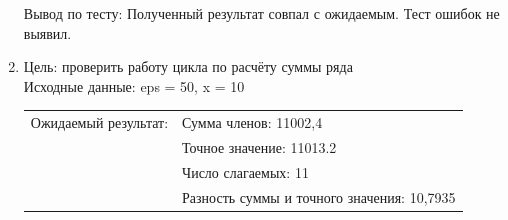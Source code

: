 \documentclass[a4paper]{article}
\begin{document}
\begin{enumerate}[label=\textbf{Тест \arabic*},start=3]
		Вывод по тесту: Полученный результат совпал с ожидаемым. Тест ошибок не выявил.
		\newpage
		
		\item Цель: проверить работу цикла по расчёту суммы ряда \\
		Исходные данные: eps = 50, x = 10 \\
		
		\begin{tabular}{l l}
			Ожидаемый результат: & Сумма членов: 11002,4                             \\
			                     & Точное значение: 11013.2                          \\
			                     & Число слагаемых: 11                               \\
			                     & Разность суммы и точного значения: 10,7935 \\[4mm]
		\end{tabular}
	

\end{enumerate}
\end{document}
